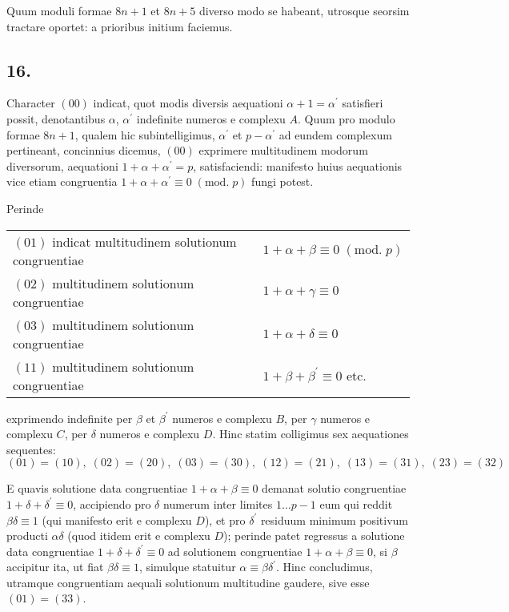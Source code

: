\documentclass[twoside,12pt]{memoir}
\renewcommand{\pmod}[1]{\;(\textrm{mod.}\;#1)}
\begin{document}
Quum moduli formae \(8 n+1\) et \(8 n+5\) diverso modo se habeant, utrosque seorsim tractare oportet: a prioribus initium faciemus.

\subsection*{16.}
 
Character \((00)\) indicat, quot modis diversis aequationi \(\alpha+1=\alpha^{\prime}\) satisfieri possit, denotantibus \(\alpha\), \(\alpha^{\prime}\) indefinite numeros e complexu \(A\). Quum pro modulo formae \(8 n+1\), qualem hic subintelligimus, \(\alpha^{\prime}\) et \(p-\alpha^{\prime}\) ad eundem complexum pertineant, concinnius dicemus, \((00)\) exprimere multitudinem modorum diversorum, aequationi \(1+\alpha+\alpha^{\prime}=p\), satisfaciendi: manifesto huius aequationis vice etiam congruentia \(1+\alpha+\alpha^{\prime} \equiv 0\pmod{p}\) fungi potest.

Perinde
\begin{center}
\begin{tabular}{ll}
\((01)\) indicat multitudinem solutionum congruentiae& \(1+\alpha+\beta \equiv 0\pmod{p}\) \\
\((02)\) multitudinem solutionum congruentiae& \(1+\alpha+\gamma \equiv 0\) \\
\((03)\) multitudinem solutionum congruentiae& \(1+\alpha+\delta \equiv 0\) \\
\((11)\) multitudinem solutionum congruentiae& \(1+\beta+\beta^{\prime} \equiv 0\) etc. \\
\end{tabular}
\end{center}
exprimendo indefinite per \(\beta\) et \(\beta^{\prime}\) numeros e complexu \(B\), per \(\gamma\) numeros e complexu \(C\), per \(\delta\) numeros e complexu \(D\). Hinc statim colligimus sex aequationes sequentes:
\[(01)=(10), \; (02)=(20), \; (03)=(30), \; (12)=(21), \;(13)=(31), \;(23)=(32)\]

E quavis solutione data congruentiae \(1+\alpha+\beta \equiv 0\) demanat solutio congruentiae \(1+\delta+\delta^{\prime} \equiv 0\), accipiendo pro \(\delta\) numerum inter limites \(1 \ldots p-1\)\pagebreak%
eum qui reddit \(\beta \delta \equiv 1\) (qui manifesto erit e complexu \(D\)), et pro \(\delta^{\prime}\) residuum minimum positivum producti \(\alpha \delta\) (quod itidem erit e complexu \(D\)); perinde patet regressus a solutione data congruentiae \(1+\delta+\delta^{\prime} \equiv 0\) ad solutionem congruentiae \(1+\alpha+\beta \equiv 0\), si \(\beta\) accipitur ita, ut fiat \(\beta \delta \equiv 1\), simulque statuitur \(\alpha \equiv \beta \delta^{\prime}\). Hinc concludimus, utramque congruentiam aequali solutionum multitudine gaudere, sive esse \((01)=(33)\).
 
\end{document}
